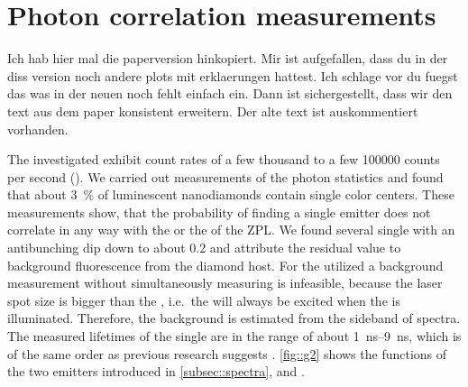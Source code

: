 	\section{Photon correlation measurements} \label{subsec::g2}

		\begin{remark}

			Ich hab hier mal die paperversion hinkopiert. Mir ist aufgefallen, dass du in der diss version noch andere plots mit erklaerungen hattest. Ich schlage vor du fuegst das was in der neuen noch fehlt einfach ein. Dann ist sichergestellt, dass wir den text aus dem paper konsistent erweitern. Der alte text ist auskommentiert vorhanden.

		\end{remark}

		The investigated \sivs exhibit count rates of a few thousand to a few \num{100000} counts per second (\SI{}{\cps}).
		We carried out measurements of the photon statistics and found that about \SI{3}{\percent} of luminescent nanodiamonds contain single color centers.
		These measurements show, that the probability of finding a single emitter does not correlate in any way with the \cwl or the \lw of the ZPL.
		We found several single \sivs with an antibunching dip down to about \num{0.2} and attribute the residual \gtz value to background fluorescence from the diamond host.
		For the utilized \nds a background measurement without simultaneously measuring \siv \pl is infeasible, because the laser spot size is bigger than the \nd, i.e.\ the \siv will always be excited when the \nd is illuminated.
		Therefore, the background is estimated from the sideband of \siv spectra.
		The measured lifetimes of the single \sivs are in the range of about \SIrange{1}{9}{ns}, which is of the same order as previous research suggests \cite{Sipahigil2014,Sternschulte1994}.
		\autoref{fig::g2} shows the \gt functions of the two emitters introduced in \autoref{subsec::spectra}, \emnarrow and \embroad.

